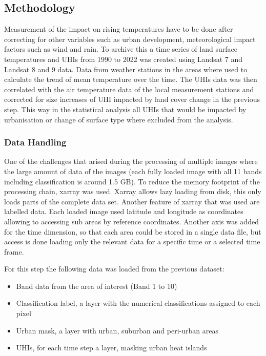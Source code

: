\documentclass[12pt,a4paper, english,twoside]{scrartcl}
\begin{document}
    \subsection{Methodology}
      Measurement of the impact on rising temperatures have to be done after correcting for other variables such as urban development, meteorological impact factors such as wind and rain. 
      To archive this a time series of land surface temperatures and \glspl{UHI} from 1990 to 2022 was created using Landsat 7 and Landsat 8 and 9 data.
      Data from weather stations in the areas where used to calculate the trend of mean temperature over the time. 
      The \glspl{UHI} data was then correlated with the air temperature data of the local measurement stations and corrected for size increases of \gls{UHI} impacted by land cover change in the previous step. 
      This way in the statistical analysis all \glspl{UHI} that would be impacted by urbanisation or change of surface type where excluded from the analysis.
    \subsubsection{Data Handling}
      One of the challenges that arised during the processing of multiple images where the large amount of data of the images (each fully loaded image with all 11 bands including classification is around 1.5 GB).
      To reduce the memory footprint of the processing chain, xarray \autocite{hoyer2017xarray} was used. 
      Xarray allows lazy loading from disk, this only loads parts of the complete data set. 
      Another feature of xarray that was used are labelled data. Each loaded image used latitude and longitude as coordinates allowing to accessing sub areas by reference coordinates. 
      Another axis was added for the time dimension, so that each area could be stored in a single data file, but access is done loading only the relevant data for a specific time or a selected time frame.
  
      For this step the following data was loaded from the previous dataset: 
      \begin{itemize}
        \item Band data from the area of interest (Band 1 to 10)
        \item Classification label, a layer with the numerical classifications assigned to each pixel 
        \item Urban mask, a layer with urban, suburban and peri-urban areas
        \item \glspl{UHI}, for each time step a layer, masking urban heat islands
      \end{itemize}
\end{document}
